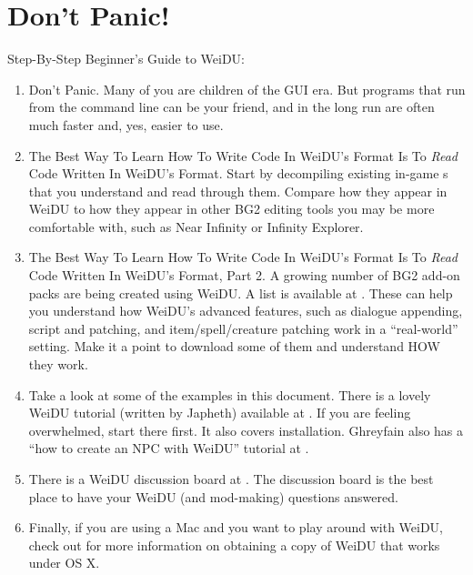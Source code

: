 \documentclass{article}
\def\ttref#1{\ahrefloc{#1}{\tt #1}}
\begin{document}
\section{Don't Panic!}

Step-By-Step Beginner's Guide to WeiDU:

\begin{enumerate}

\item Don't Panic. Many of you are children of the GUI era. But programs
that run from the command line can be your friend, and in the long run are
often much faster and, yes, easier to use.

\item The Best Way To Learn How To Write Code In WeiDU's \ttref{D} Format
Is To {\em Read} Code Written In WeiDU's \ttref{D} Format. Start by decompiling
existing in-game \ttref{DLG}s that you understand and read through them.
Compare how they appear in WeiDU to how they appear in other BG2 editing
tools you may be more comfortable with, such as Near Infinity or Infinity
Explorer.

\item The Best Way To Learn How To Write Code In WeiDU's \ttref{D} Format
Is To {\em Read} Code Written In WeiDU's \ttref{D} Format, Part 2. A growing
number of BG2 add-on packs are being created using WeiDU. A list is
available at
.
These
can help you understand how WeiDU's advanced features, such as dialogue
appending, script and \ttref{2DA} patching, and item/spell/creature
patching work in a ``real-world'' setting.  Make it a point to download some
of them and understand HOW they work.

\item Take a look at some of the examples in this document. 
There is a lovely WeiDU tutorial (written by
Japheth) available at
.  
If you
are feeling overwhelmed, start there first. It also covers installation.
Ghreyfain also has a ``how to create an NPC with WeiDU'' tutorial at
. 

\item There is a WeiDU discussion board at
.  The
discussion board is the best place to have your WeiDU (and mod-making)
questions answered. 

\item Finally, if you are using a Mac and you want to play around with
WeiDU, check out  for more
information on obtaining a copy of WeiDU that works under OS X. 

\end{enumerate}
\end{document}
